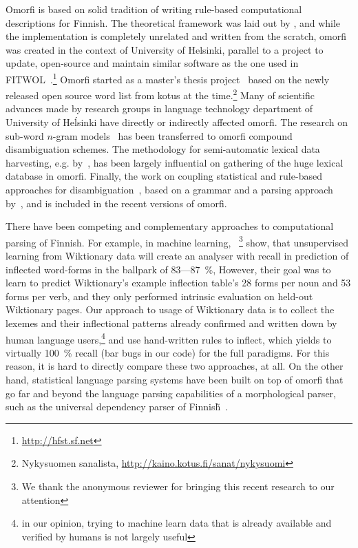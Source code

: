 \documentclass[a4paper,12pt]{article}
\begin{document}
Omorfi is based on solid tradition of writing rule-based computational
descriptions for Finnish. The theoretical framework was laid out by
\citet{koskenniemi1983twolevel}, and while the implementation is completely
unrelated and written from the scratch, omorfi was created in the context of
University of Helsinki, parallel to a project to update, open-source and
maintain similar software as the one used in
FITWOL~\citep{hfst2012}.\footnote{\url{http://hfst.sf.net}} Omorfi started  as
a master's thesis project~\citep{pirinen2008suomen} based on the newly released
open source word list from kotus at the time.\footnote{Nykysuomen sanalista,
\url{http://kaino.kotus.fi/sanat/nykysuomi}} Many of scientific advances made
by research groups in language technology department of University of Heĺsinki
have directly or indirectly affected omorfi. The research on sub-word
\(n\)-gram models~\citep{pirinen2009weighted,pirinen2009weighting} has been
transferred to omorfi compound disambiguation schemes. The methodology for
semi-automatic lexical data harvesting, e.g.
by~\citep{linden2008probabilistic}, has been largely influential on gathering
of the huge lexical database in omorfi. Finally, the work on coupling
statistical and rule-based approaches for
disambiguation~\citep{pirinen2015using}, based on a grammar and a parsing
approach by~\citet{karlsson1995constraint}, and is included in the recent
versions of omorfi.

There have been competing and complementary approaches to computational
parsing of Finnish. For example, in machine learning,
~\citet{durrett2013supervised}\footnote{We thank the anonymous reviewer for
bringing this recent research to our attention} show, that unsupervised
learning from Wiktionary data will create an analyser with recall in
prediction of inflected word-forms in the ballpark of 83---87~\%, However,
their goal was to learn to predict Wiktionary's example inflection table's
28 forms per noun and 53 forms per verb, and they only performed intrinsic
evaluation on held-out Wiktionary pages. Our approach to usage of Wiktionary
data is to collect the lexemes and their inflectional patterns already
confirmed and written down by human language users,\footnote{in our opinion,
trying to machine learn data that is already available and verified by
humans is not largely useful} and use hand-written rules to inflect, which
yields to virtually 100~\% recall (bar bugs in our code) for the full
paradigms. For this reason, it is hard to directly compare these two
approaches, at all. On the other hand, statistical language parsing systems
have been built on top of omorfi that go far and beyond the language parsing
capabilities of a morphological parser, such as the universal dependency
parser of Finnish̃~\cite{pyysalo2015universal}.
\end{document}
